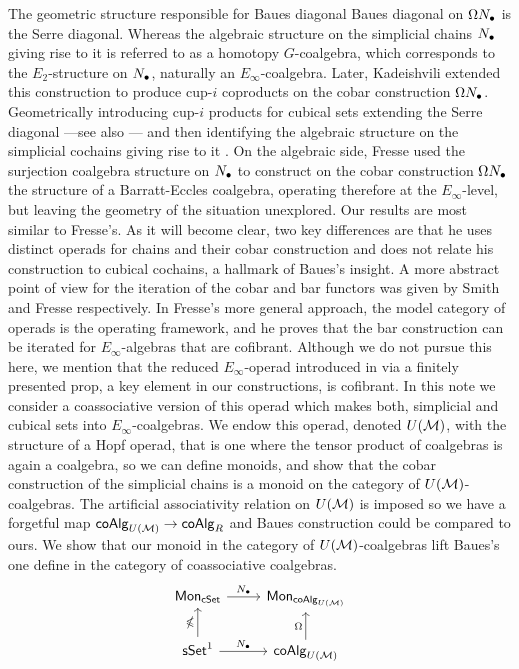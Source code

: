 The geometric structure responsible for Baues diagonal Baues diagonal on $\Omega N_\bullet$ is the Serre diagonal.
Whereas the algebraic structure on the simplicial chains $N_\bullet$ giving rise to it is referred to as a homotopy $G$-coalgebra, which corresponds to the $E_2$-structure on $N_\bullet$, naturally an $E_\infty$-coalgebra.
Later, Kadeishvili extended this construction to produce cup-$i$ coproducts on the cobar construction $\Omega N_\bullet$.
Geometrically introducing cup-$i$ products for cubical sets extending the Serre diagonal \cite{Kadeishvili99coproducts} ---see also \cite{Pilarczyk2016cubical}--- and then identifying the algebraic structure on the simplicial cochains giving rise to it \cite{Kadeishvili03cup-i}.
On the algebraic side, Fresse \cite{Fresse03construction} used the surjection coalgebra structure on $N_\bullet$ to construct on the cobar construction $\Omega N_\bullet$ the  structure of a Barratt-Eccles coalgebra, operating therefore at the $E_\infty$-level, but leaving the geometry of the situation unexplored.
Our results are most similar to Fresse's.
As it will become clear, two key differences are that he uses distinct operads for chains and their cobar construction and does not relate his construction to cubical cochains, a hallmark of Baues's insight.
A more abstract point of view for the iteration of the cobar and bar functors was given by Smith \cite{Smith94cobar} and Fresse \cite{Fresse10complex} respectively. 
In Fresse's more general approach, the model category of operads is the operating framework, and he proves that the bar construction can be iterated for $E_\infty$-algebras that are cofibrant.
Although we do not pursue this here, we mention that the reduced $E_\infty$-operad introduced in \cite{Medina20prop1} via a finitely presented prop, a key element in our constructions, is cofibrant.
In this note we consider a coassociative version of this operad which makes both, simplicial and cubical sets into $E_\infty$-coalgebras.
We endow this operad, denoted $U(\mathcal{M})$, with the structure of a Hopf operad, that is one where the tensor product of coalgebras is again a coalgebra, so we can define monoids, and show that the cobar construction of the simplicial chains is a monoid on the category of $U(\mathcal{M})$-coalgebras.
The artificial associativity relation on $U(\mathcal{M})$ is imposed so we have a forgetful map $\mathsf{coAlg}_{U(\mathcal{M})} \to \mathsf{coAlg}_R$ and Baues construction could be compared to ours. We show that our monoid in the category of $U(\mathcal{M})$-coalgebras lift Baues's one define in the category of coassociative coalgebras.
\begin{equation*}
\begin{tikzcd}
\Mon_{\cSet} \arrow[r, "\chains"] & \Mon_{\coAlg_{U(\M)}} \\
\sSet^1 \arrow[r, "\chains"] \arrow[u, "\gcobar"] & \coAlg_{U(\M)} \arrow[u, "\cobar"]
\end{tikzcd}
\end{equation*}

